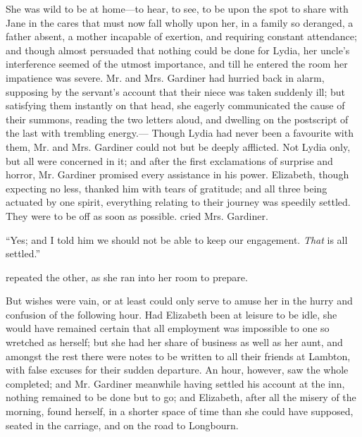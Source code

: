 She was wild to be at home---to hear, to see, to be upon the spot to share with Jane in the cares that must now fall wholly upon her, in a family so deranged, a father absent, a mother incapable of exertion, and requiring constant attendance; and though almost persuaded that nothing could be done for Lydia, her uncle's interference seemed of the utmost importance, and till he entered the room her impatience was severe. Mr. and Mrs. Gardiner had hurried back in alarm, supposing by the servant's account that their niece was taken suddenly ill; but satisfying them instantly on that head, she eagerly communicated the cause of their summons, reading the two letters aloud, and dwelling on the postscript of the last with trembling energy.--- Though Lydia had never been a favourite with them, Mr. and Mrs. Gardiner could not but be deeply afflicted. Not Lydia only, but all were concerned in it; and after the first exclamations of surprise and horror, Mr. Gardiner promised every assistance in his power. Elizabeth, though expecting no less, thanked him with tears of gratitude; and all three being actuated by one spirit, everything relating to their journey was speedily settled. They were to be off as soon as possible.  cried Mrs. Gardiner. 

“Yes; and I told him we should not be able to keep our engagement. {\em That} is all settled.”

 repeated the other, as she ran into her room to prepare. 

But wishes were vain, or at least could only serve to amuse her in the hurry and confusion of the following hour. Had Elizabeth been at leisure to be idle, she would have remained certain that all employment was impossible to one so wretched as herself; but she had her share of business as well as her aunt, and amongst the rest there were notes to be written to all their friends at Lambton, with false excuses for their sudden departure. An hour, however, saw the whole completed; and Mr. Gardiner meanwhile having settled his account at the inn, nothing remained to be done but to go; and Elizabeth, after all the misery of the morning, found herself, in a shorter space of time than she could have supposed, seated in the carriage, and on the road to Longbourn.

